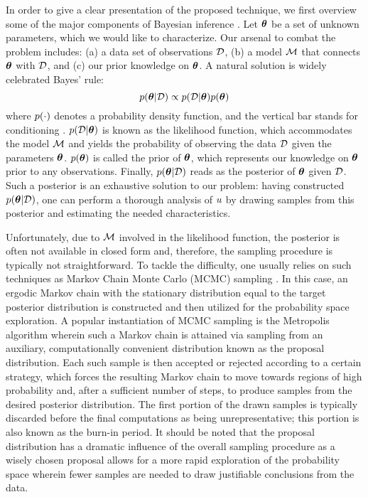 In order to give a clear presentation of the proposed technique, we first overview some of the major components of Bayesian inference \cite{gelman2004}.
Let ${\boldsymbol\theta}$ be a set of unknown parameters, which we would like to characterize. Our arsenal to combat the problem includes: (a) a data set of observations $\mathcal{D}$, (b) a model $\model$ that connects ${\boldsymbol\theta}$ with $\mathcal{D}$, and (c) our prior knowledge on ${\boldsymbol\theta}$. A natural solution is widely celebrated Bayes' rule:
\[
  \f{\vparam | \Data} \propto \f{\Data | \vparam} \f{\vparam}
\]
where $\f{\cdot}$ denotes a probability density function, and the vertical bar stands for conditioning \cite{durrett2010}.
$\f{\Data | \vparam}$ is known as the likelihood function, which accommodates the model $\model$ and yields the probability of observing the data $\mathcal{D}$ given the parameters ${\boldsymbol\theta}$.
$\f{\vparam}$ is called the prior of ${\boldsymbol\theta}$, which represents our knowledge on ${\boldsymbol\theta}$ prior to any observations.
Finally, $\f{\vparam | \Data}$ reads as the posterior of ${\boldsymbol\theta}$ given $\mathcal{D}$. Such a posterior is an exhaustive solution to our problem: having constructed $\f{\vparam | \Data}$, one can perform a thorough analysis of $u$ by drawing samples from this posterior and estimating the needed characteristics.

Unfortunately, due to $\model$ involved in the likelihood function, the posterior is often not available in closed form and, therefore, the sampling procedure is typically not straightforward.
To tackle the difficulty, one usually relies on such techniques as Markov Chain Monte Carlo (MCMC) sampling \cite{gelman2004}. In this case, an ergodic Markov chain with the stationary distribution equal to the target posterior distribution is constructed and then utilized for the probability space exploration.
A popular instantiation of MCMC sampling is the Metropolis algorithm wherein such a Markov chain is attained via sampling from an auxiliary, computationally convenient distribution known as the proposal distribution.
Each such sample is then accepted or rejected according to a certain strategy, which forces the resulting Markov chain to move towards regions of high probability and, after a sufficient number of steps, to produce samples from the desired posterior distribution.
The first portion of the drawn samples is typically discarded before the final computations as being unrepresentative; this portion is also known as the burn-in period.
It should be noted that the proposal distribution has a dramatic influence of the overall sampling procedure as a wisely chosen proposal allows for a more rapid exploration of the probability space wherein fewer samples are needed to draw justifiable conclusions from the data.
